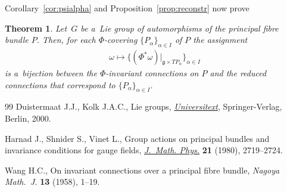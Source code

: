 \documentclass[11pt]{article}
\numberwithin{equation}{section}
\newtheorem{Theorem}{Theorem}[section]
\begin{document}
 Corollary~\ref{cor:psialpha} and Proposition~\ref{prop:reconstr} now prove
\begin{Theorem}\label{th:InvConnes}
Let~$G$ be a~Lie group of automorphisms of the principal fibre bundle $P$.
Then, for each $\Phi$-covering $\{P_\alpha\}_{\alpha\in I}$ of $P$
the assignment
\begin{gather*}
	\omega \mapsto \{(\Phi^*\omega)|_{\mathfrak{g}\times TP_\alpha}\}_{\alpha\in I}
\end{gather*}
is a~bijection between
the $\Phi$-invariant connections on $P$ and the
reduced connections that correspond to $\{P_\alpha\}_{\alpha\in I}$.
\end{Theorem}
\begin{thebibliography}{99}
Duistermaat J.J., Kolk J.A.C., Lie groups, \href{http://dx.doi.org/10.1007/978-3-642-56936-4}{\textit{Universitext}}, Springer-Verlag,
  Berlin, 2000.

Harnad J., Shnider S., Vinet L., Group actions on principal bundles and
  invariance conditions for gauge f\/ields, \href{http://dx.doi.org/10.1063/1.524389}{\textit{J.~Math. Phys.}} \textbf{21}
  (1980), 2719--2724.

Wang H.C., On invariant connections over a principal f\/ibre bundle,
  \textit{Nagoya Math.~J.} \textbf{13} (1958), 1--19.

\end{thebibliography}
\end{document}
